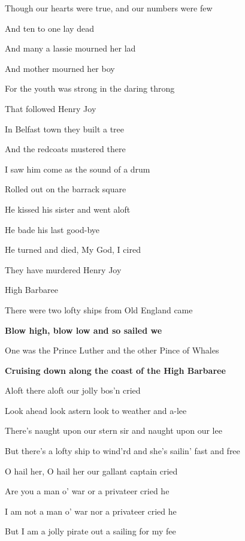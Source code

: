 \documentclass[letterpaper,9pt]{article}
\begin{document}
Though our hearts were true, and our numbers were few

And ten to one lay dead

And many a lassie mourned her lad

And mother mourned her boy

For the youth was strong in the daring throng

That followed Henry Joy

\hfill

In Belfast town they built a tree

And the redcoats mustered there

I saw him come as the sound of a drum

Rolled out on the barrack square

He kissed his sister and went aloft

He bade his last good-bye

He turned and died, My God, I cired

They have murdered Henry Joy

\newpage
{}
\huge
High Barbaree

\LARGE

\hfill

There were two lofty ships from Old England came

\textbf{Blow high, blow low and so sailed we}

One was the Prince Luther and the other Pince of Whales

\textbf{Cruising down along the coast of the High Barbaree}

\hfill

Aloft there aloft our jolly bos’n cried

Look ahead look astern look to weather and a-lee

\hfill

There’s naught upon our stern sir and naught upon our lee

But there’s a lofty ship to wind’rd and she’s sailin’ fast and free

\hfill

O hail her, O hail her our gallant captain cried

Are you a man o’ war or a privateer cried he

\hfill

I am not a man o’ war nor a privateer cried he

But I am a jolly pirate out a sailing for my fee
\end{document}
